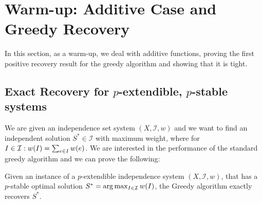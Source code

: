 \section{Warm-up: Additive Case and Greedy Recovery}\label{sec:additive}
In this section, as a warm-up, we deal with additive functions, proving the first positive recovery result for the greedy algorithm and showing that it is tight.
\subsection{Exact Recovery for $p$-extendible, $p$-stable systems}

We are given an independence set system $(X,\mathcal{I},w)$ and we want to find an independent solution $S^* \in \mathcal{I}$ with maximum weight, where for $I\in\mathcal{I}: w(I)=\sum_{e \in I}w(e)$. We are interested in the performance of the standard greedy algorithm and we can prove the following: 





\begin{theorem}\label{greedy-additive}
Given an instance of a $p$-extendible independence system $(X,\mathcal{I},w)$, that has a $p$-stable optimal solution $S^* = \arg \max_{I\in \mathcal{I}}w(I)$, the Greedy algorithm exactly recovers $S^*$.
\end{theorem}

